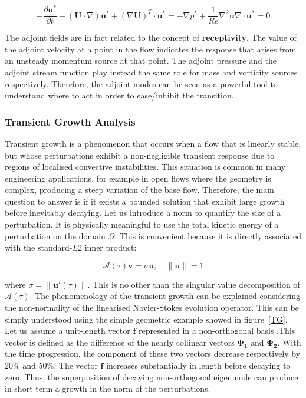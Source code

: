 \begin{subequations}
\begin{equation}
-\frac{\partial \mathbf{u}^*}{\partial t}+(\mathbf{U} \cdot \nabla)\mathbf{u}^*+(\nabla \mathbf{U})^T \cdot \mathbf{u}^*=-\nabla p^*+\frac{1}{Re} \nabla^2 \mathbf{u}
\end{equation}

\begin{equation}
\nabla \cdot \mathbf{u}^*=0
\end{equation}
\end{subequations}

The adjoint fields are in fact related to the concept of \textbf{receptivity}. The value of the adjoint velocity at a point in the flow indicates the response that arises from an unsteady momentum source at that point. The adjoint pressure and the adjoint stream function play instead the same role for mass and vorticity sources respectively. Therefore, the adjoint modes can be seen as a powerful tool to understand where to act in order to ease/inhibit the transition.

\subsubsection{Transient Growth Analysis}

Transient growth  is a phenomenon that occurs when a flow that is linearly stable, but whose perturbations exhibit a non-negligible transient response due to regions of localised convective instabilities. This situation is common in many engineering applications, for example in open flows where the geometry is complex, producing a steep variation of the base flow. Therefore, the main question to answer is if it exists a bounded solution that exhibit large growth before inevitably decaying. Let us introduce a norm to quantify the size of a perturbation. It is physically meaningful to use the total kinetic energy of a perturbation on the domain $\Omega$. This is convenient because it is directly associated with the
standard-$L2$ inner product:

\begin{equation}
\mathcal{A}(\tau)\mathbf{v}=\sigma \mathbf{u}, \quad \left\| \mathbf{u} \right\|=1
\end{equation}


where $\sigma=\left\| \mathbf{u'}(\tau)\right\|$. This is no other
than the singular value decomposition of $\mathcal{A}(\tau)$. The
phenomenology of the transient growth can be explained considering the
non-normality of the linearised Navier-Stokes evolution operator. This
can be simply understood using the simple geometric example showed in
figure~\ref{TG}. Let us assume a unit-length vector $\mathbf{f}$
represented in a non-orthogonal basis .This vector is defined as the
difference of the nearly collinear vectors $\mathbf{\Phi_1}$ and
$\mathbf{\Phi_2}$.  With the time progression, the component of these
two vectors decrease respectively by 20\% and 50\%. The vector
$\mathbf{f}$ increases substantially in length before decaying to
zero. Thus, the superposition of decaying non-orthogonal eigenmode can
produce in short term a growth in the norm of the perturbations.


